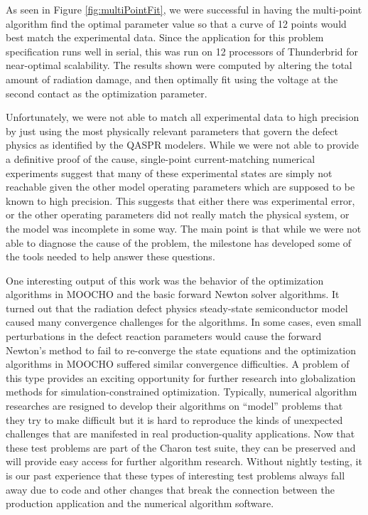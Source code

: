\documentclass[pdf,ps2pdf,11pt]{SANDreport}
\begin{document}

As seen in Figure {}\ref{fig:multiPointFit}, we were successful in having the
multi-point algorithm find the optimal parameter value so that a curve of 12
points would best match the experimental data. Since the application for this
problem specification runs well in serial, this was run on 12 processors of
Thunderbrid for near-optimal scalability.  The results shown were computed by
altering the total amount of radiation damage, and then optimally fit using
the voltage at the second contact as the optimization parameter.

Unfortunately, we were not able to match all experimental data to high
precision by just using the most physically relevant parameters that govern
the defect physics as identified by the QASPR modelers.  While we were not
able to provide a definitive proof of the cause, single-point current-matching
numerical experiments suggest that many of these experimental states are
simply not reachable given the other model operating parameters which are
supposed to be known to high precision.  This suggests that either there was
experimental error, or the other operating parameters did not really match the
physical system, or the model was incomplete in some way.  The main point is
that while we were not able to diagnose the cause of the problem, the
milestone has developed some of the tools needed to help answer these
questions.


One interesting output of this work was the behavior of the optimization
algorithms in MOOCHO and the basic forward Newton solver algorithms.  It turned out
that the radiation defect physics steady-state semiconductor model caused many
convergence challenges for the algorithms.  In some cases, even small
perturbations in the defect reaction parameters would cause the forward
Newton's method to fail to re-converge the state equations and the
optimization algorithms in MOOCHO suffered similar convergence difficulties.
A problem of this type provides an exciting opportunity for further
research into globalization methods for simulation-constrained optimization.
Typically, numerical algorithm researches are resigned to develop their
algorithms on ``model'' problems that they try to make difficult but it is
hard to reproduce the kinds of unexpected challenges that are manifested in
real production-quality applications.  Now that these test
problems are part of the Charon test suite, they can be preserved and will
provide easy access for further algorithm research.  Without nightly testing,
it is our past experience that these types of interesting test problems always
fall away due to code and other changes that break the connection between the
production application and the numerical algorithm software.
\end{document}
